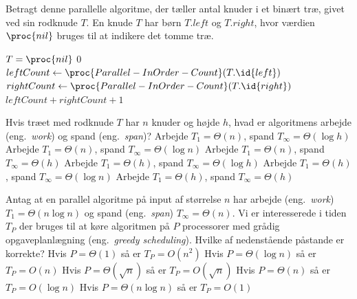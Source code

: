 Betragt denne parallelle algoritme, der tæller antal knuder i et binært træ, givet ved sin rodknude $T$.
En knude $T$ har børn $T.left$ og $T.right$, hvor værdien $\proc{nil}$ bruges til at indikere det tomme træ.

\begin{codebox}
\li \If $T = \proc{nil}$ 
\li \Then \Return $0$
\li \Else
\li     \Spawn $leftCount \gets \proc{Parallel-InOrder-Count}(T.\id{left})$
\li     $rightCount \gets \proc{Parallel-InOrder-Count}(T.\id{right})$
\li     \Sync
\li     \Return $leftCount + rightCount + 1$
\end{codebox}
Hvis træet med rodknude $T$ har $n$ knuder og højde $h$, hvad er algoritmens arbejde (eng.~\emph{work}) og spand (eng.~\emph{span})?
\etsvar
\mulighederstart
\svar Arbejde $T_1=\Theta(n)$, spand $T_\infty=\Theta(\log h)$
\svar Arbejde $T_1=\Theta(n)$, spand $T_\infty=\Theta(\log n)$
\svar Arbejde $T_1=\Theta(n)$, spand $T_\infty=\Theta(h)$ \korrekt
\svar Arbejde $T_1=\Theta(h)$, spand $T_\infty=\Theta(\log h)$
\svar Arbejde $T_1=\Theta(h)$, spand $T_\infty=\Theta(\log n)$
\svar Arbejde $T_1=\Theta(h)$, spand $T_\infty=\Theta(h)$
\mulighederslut
{}

Antag at en parallel algoritme på input af størrelse $n$ har arbejde (eng.~\emph{work}) $T_1=\Theta(n \log n)$ og spand (eng.~\emph{span}) $T_\infty=\Theta(n)$.
Vi er interesserede i tiden $T_P$ der bruges til at køre algoritmen på $P$ processorer med grådig opgaveplanlægning (eng.~\emph{greedy scheduling}).
Hvilke af nedenstående påstande er korrekte?
\fleresvar
\mulighederstart
\svar Hvis $P = \Theta(1)$ så er $T_P = O(n^2)$ \korrekt
\svar Hvis $P = \Theta(\log{n})$ så er $T_P = O(n)$ \korrekt
\svar Hvis $P = \Theta(\sqrt{n})$ så er $T_P = O(\sqrt{n})$
\svar Hvis $P = \Theta(n)$ så er $T_P = O(\log n)$
\svar Hvis $P = \Theta(n \log n)$ så er $T_P = O(1)$
\mulighederslut
{}

